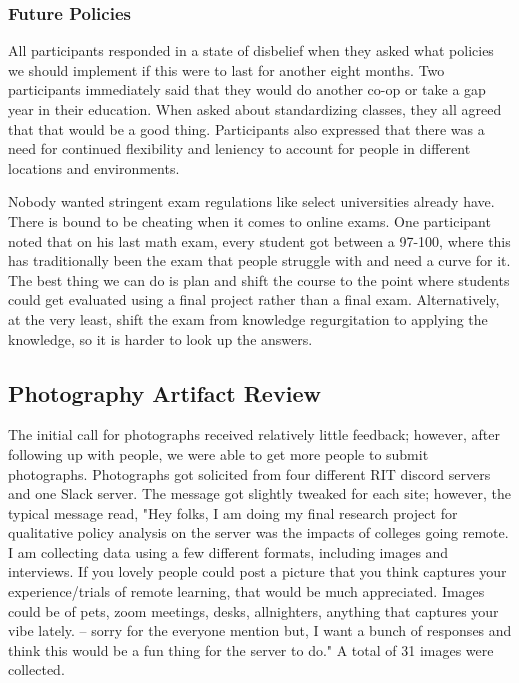 \documentclass[12pt,
 reprint,
nofootinbib,
 amsmath,amssymb,
 aps,
floatfix,
]{revtex4-2}
\begin{document}
\subsubsection{Future Policies}


All participants responded in a state of disbelief when they asked what policies we should implement if this were to last for another eight months. Two participants immediately said that they would do another co-op or take a gap year in their education. When asked about standardizing classes, they all agreed that that would be a good thing. Participants also expressed that there was a need for continued flexibility and leniency to account for people in different locations and environments.

Nobody wanted stringent exam regulations like select universities already have. There is bound to be cheating when it comes to online exams. One participant noted that on his last math exam, every student got between a 97-100, where this has traditionally been the exam that people struggle with and need a curve for it. The best thing we can do is plan and shift the course to the point where students could get evaluated using a final project rather than a final exam. Alternatively, at the very least, shift the exam from knowledge regurgitation to applying the knowledge, so it is harder to look up the answers. 


\subsection{Photography Artifact Review}

The initial call for photographs received relatively little feedback; however, after following up with people, we were able to get more people to submit photographs. Photographs got solicited from four different RIT discord servers and one Slack server. The message got slightly tweaked for each site; however, the typical message read, "Hey folks, I am doing my final research project for qualitative policy analysis on the server was the impacts of colleges going remote. I am collecting data using a few different formats, including images and interviews. If you lovely people could post a picture that you think captures your experience/trials of remote learning, that would be much appreciated. Images could be of pets, zoom meetings, desks, allnighters, anything that captures your vibe lately. -- sorry for the everyone mention but, I want a bunch of responses and think this would be a fun thing for the server to do." A total of 31 images were collected.
\end{document}
